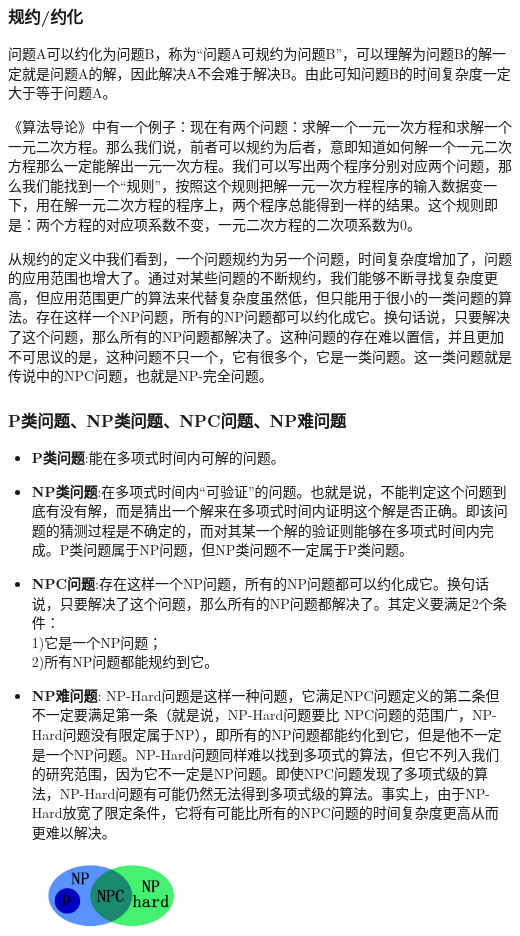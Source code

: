 \documentclass[11pt,a4paper,oneside]{book}
\begin{document}
\subsubsection{规约/约化}
问题A可以约化为问题B，称为“问题A可规约为问题B”，可以理解为问题B的解一定就是问题A的解，因此解决A不会难于解决B。由此可知问题B的时间复杂度一定大于等于问题A。

《算法导论》中有一个例子：现在有两个问题：求解一个一元一次方程和求解一个一元二次方程。那么我们说，前者可以规约为后者，意即知道如何解一个一元二次方程那么一定能解出一元一次方程。我们可以写出两个程序分别对应两个问题，那么我们能找到一个“规则”，按照这个规则把解一元一次方程程序的输入数据变一下，用在解一元二次方程的程序上，两个程序总能得到一样的结果。这个规则即是：两个方程的对应项系数不变，一元二次方程的二次项系数为0。

从规约的定义中我们看到，一个问题规约为另一个问题，时间复杂度增加了，问题的应用范围也增大了。通过对某些问题的不断规约，我们能够不断寻找复杂度更高，但应用范围更广的算法来代替复杂度虽然低，但只能用于很小的一类问题的算法。存在这样一个NP问题，所有的NP问题都可以约化成它。换句话说，只要解决了这个问题，那么所有的NP问题都解决了。这种问题的存在难以置信，并且更加不可思议的是，这种问题不只一个，它有很多个，它是一类问题。这一类问题就是传说中的NPC问题，也就是NP-完全问题。

\subsubsection{P类问题、NP类问题、NPC问题、NP难问题}
\begin{itemize}
	\item \textbf{P类问题}:能在多项式时间内可解的问题。
	\item \textbf{NP类问题}:在多项式时间内“可验证”的问题。也就是说，不能判定这个问题到底有没有解，而是猜出一个解来在多项式时间内证明这个解是否正确。即该问题的猜测过程是不确定的，而对其某一个解的验证则能够在多项式时间内完成。P类问题属于NP问题，但NP类问题不一定属于P类问题。
	\item \textbf{NPC问题}:存在这样一个NP问题，所有的NP问题都可以约化成它。换句话说，只要解决了这个问题，那么所有的NP问题都解决了。其定义要满足2个条件：\\
	1)它是一个NP问题；\\
	2)所有NP问题都能规约到它。
	\item \textbf{NP难问题}: NP-Hard问题是这样一种问题，它满足NPC问题定义的第二条但不一定要满足第一条（就是说，NP-Hard问题要比 NPC问题的范围广，NP-Hard问题没有限定属于NP），即所有的NP问题都能约化到它，但是他不一定是一个NP问题。NP-Hard问题同样难以找到多项式的算法，但它不列入我们的研究范围，因为它不一定是NP问题。即使NPC问题发现了多项式级的算法，NP-Hard问题有可能仍然无法得到多项式级的算法。事实上，由于NP-Hard放宽了限定条件，它将有可能比所有的NPC问题的时间复杂度更高从而更难以解决。
\end{itemize}
\begin{figure}[H]
	\centering
	\includegraphics[width=0.3\textwidth]{5.png}
\end{figure}
\end{document}
